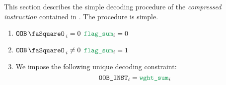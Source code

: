 This section describes the simple decoding procedure of the \emph{compressed instruction} contained in \oobInstruction{}. The procedure is simple.
\begin{enumerate}
	\item \If $\oobStamp_{i} =    0$ \Then $\flagSum_{i} = 0$
	\item \If $\oobStamp_{i} \neq 0$ \Then $\flagSum_{i} = 1$
	\item We impose the following unique decoding constraint:
		\[
			\oobInstruction _{i} = \weightedFlagSum_{i}
		\]
\end{enumerate}
